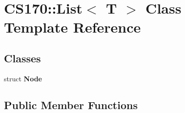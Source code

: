\hypertarget{class_c_s170_1_1_list}{\section{C\-S170\-:\-:List$<$ T $>$ Class Template Reference}
\label{class_c_s170_1_1_list}
}
\subsection*{Classes}
\begin{DoxyCompactItemize}
\item 
struct {\bfseries Node}
\end{DoxyCompactItemize}
\subsection*{Public Member Functions}
